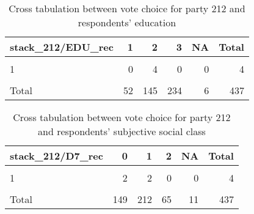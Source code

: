 \documentclass[
]{article}
\begin{document}
\begin{table}

\caption{\label{tab:unnamed-chunk-14}Cross tabulation between vote choice for party 212 and respondents' education
                   \label{table:crosstab_2_be}}
\centering
\begin{tabular}[t]{l|r|r|r|r|r}
\hline
stack\_212/EDU\_rec & 1 & 2 & 3 & NA & Total\\
\hline
\cellcolor{gray!6}{0} & \cellcolor{gray!6}{48} & \cellcolor{gray!6}{132} & \cellcolor{gray!6}{223} & \cellcolor{gray!6}{5} & \cellcolor{gray!6}{408}\\
\hline
1 & 0 & 4 & 0 & 0 & 4\\
\hline
\cellcolor{gray!6}{NA} & \cellcolor{gray!6}{4} & \cellcolor{gray!6}{9} & \cellcolor{gray!6}{11} & \cellcolor{gray!6}{1} & \cellcolor{gray!6}{25}\\
\hline
Total & 52 & 145 & 234 & 6 & 437\\
\hline
\end{tabular}
\end{table}

\begin{table}

\caption{\label{tab:unnamed-chunk-14}Cross tabulation between vote choice for party 212 and respondents' subjective social class
                   \label{table:crosstab_3_be}}
\centering
\begin{tabular}[t]{l|r|r|r|r|r}
\hline
stack\_212/D7\_rec & 0 & 1 & 2 & NA & Total\\
\hline
\cellcolor{gray!6}{0} & \cellcolor{gray!6}{140} & \cellcolor{gray!6}{196} & \cellcolor{gray!6}{64} & \cellcolor{gray!6}{8} & \cellcolor{gray!6}{408}\\
\hline
1 & 2 & 2 & 0 & 0 & 4\\
\hline
\cellcolor{gray!6}{NA} & \cellcolor{gray!6}{7} & \cellcolor{gray!6}{14} & \cellcolor{gray!6}{1} & \cellcolor{gray!6}{3} & \cellcolor{gray!6}{25}\\
\hline
Total & 149 & 212 & 65 & 11 & 437\\
\hline
\end{tabular}
\end{table}
\end{document}

